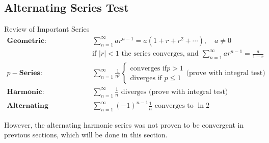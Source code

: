 \documentclass[12pt,a4paper]{article}
\begin{document}
\subsection{Alternating Series Test}\label{Alternating}
\begin{rmk}{Review of Important Series}
	$$\begin{aligned}
		\textbf{Geometric:}\quad &\sum^\infty_{n=1}{ar^{n-1}}=a\left(1+r+r^2+\cdots\right),\quad a\neq0\\
		&\text{if }|r|<1\text{ the series converges, and }\sum^\infty_{n=1}a r^{n-1}=\frac{a}{1-r}\\
		p-\textbf{Series:}\quad &\sum^\infty_{n=1}\frac{1}{n^p}\begin{cases}\text{converges if} p>1\\\text{diverges if }p\leq1\end{cases}\text{(prove with integral test)}\\
		\textbf{Harmonic:}\quad &\sum^\infty_{n=1}\frac{1}{n}\text{ diverges (prove with integral test)}\\
		\textbf{Alternating Harmonic:}\quad &\sum_{n=1}^\infty(-1)^{n-1}\frac{1}{n}\text{ converges to }\ln{2}
	\end{aligned}$$
\end{rmk}
However, the alternating harmonic series was not proven to be convergent in previous sections, which will be done in this section. 
\end{document}
